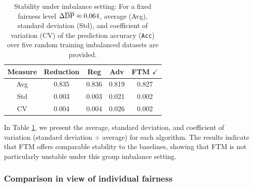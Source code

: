 \documentclass[10pt]{article} %
\begin{document}
\begin{table}[h]
    \centering
    \footnotesize
    \caption{
    Stability under imbalance setting:
    For a fixed fairness level $\Delta \overline{\textup{DP}} \approx 0.064$, average (Avg), standard deviation (Std), and coefficient of variation (CV) of the prediction accuracy (\texttt{Acc}) over five random training imbalanced datasets are provided.
    }
    \label{table:stabilities}
    \begin{tabular}{c||c|c|c|c}
        \toprule
        Measure & Reduction & Reg & Adv & FTM $\checkmark$
        \\
        \midrule
        Avg & 0.835 & 0.836 & 0.819 & 0.827
        \\
        Std & 0.003 & 0.003 & 0.021 & 0.002
        \\
        CV & 0.004 & 0.004 & 0.026 & 0.002
        \\
        \bottomrule
    \end{tabular}
    \vskip -0.1in
\end{table}

In Table \ref{table:stabilities}, we present the average, standard deviation, and coefficient of variation (standard deviation $\div$ average) for each algorithm.
The results indicate that FTM offers comparable stability to the baselines, showing that FTM is not particularly unstable under this group imbalance setting.



\subsubsection{Comparison in view of individual fairness}\label{sec:add_exps_indi}
\end{document}
